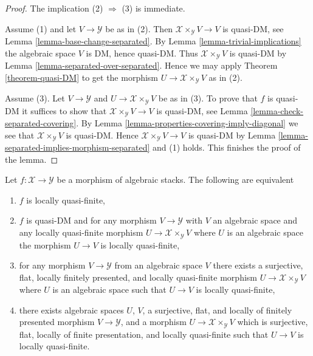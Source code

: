 \begin{proof}
The implication (2) $\Rightarrow$ (3) is immediate.

\medskip\noindent
Assume (1) and let $V \to \mathcal{Y}$ be as in (2). Then
$\mathcal{X} \times_\mathcal{Y} V \to V$ is quasi-DM, see
Lemma \ref{lemma-base-change-separated}.
By
Lemma \ref{lemma-trivial-implications}
the algebraic space $V$ is DM, hence quasi-DM. Thus
$\mathcal{X} \times_\mathcal{Y} V$ is quasi-DM by
Lemma \ref{lemma-separated-over-separated}.
Hence we may apply
Theorem \ref{theorem-quasi-DM}
to get the morphism $U \to \mathcal{X} \times_\mathcal{Y} V$
as in (2).

\medskip\noindent
Assume (3). Let $V \to \mathcal{Y}$ and
$U \to \mathcal{X} \times_\mathcal{Y} V$ be as in (3).
To prove that $f$ is quasi-DM it suffices to show that
$\mathcal{X} \times_\mathcal{Y} V \to V$ is quasi-DM, see
Lemma \ref{lemma-check-separated-covering}.
By
Lemma \ref{lemma-properties-covering-imply-diagonal}
we see that $\mathcal{X} \times_\mathcal{Y} V$ is quasi-DM.
Hence $\mathcal{X} \times_\mathcal{Y} V \to V$ is quasi-DM by
Lemma \ref{lemma-separated-implies-morphism-separated}
and (1) holds. This finishes the proof of the lemma.
\end{proof}

\begin{lemma}
\label{lemma-characterize-locally-quasi-finite}
Let $f : \mathcal{X} \to \mathcal{Y}$ be a morphism of algebraic stacks.
The following are equivalent
\begin{enumerate}
\item $f$ is locally quasi-finite,
\item $f$ is quasi-DM and for any morphism $V \to \mathcal{Y}$ with $V$
an algebraic space and any locally quasi-finite morphism
$U \to \mathcal{X} \times_\mathcal{Y} V$ where $U$ is an algebraic space
the morphism $U \to V$ is locally quasi-finite,
\item for any morphism $V \to \mathcal{Y}$ from an algebraic space $V$
there exists a surjective, flat, locally finitely presented, and locally
quasi-finite morphism $U \to \mathcal{X} \times_\mathcal{Y} V$ where
$U$ is an algebraic space such that $U \to V$ is locally quasi-finite,
\item there exists algebraic spaces $U$, $V$, a surjective, flat,
and locally of finitely presented morphism $V \to \mathcal{Y}$,
and a morphism $U \to \mathcal{X} \times_\mathcal{Y} V$ which
is surjective, flat, locally of finite presentation, and
locally quasi-finite such that $U \to V$ is locally quasi-finite.
\end{enumerate}
\end{lemma}

